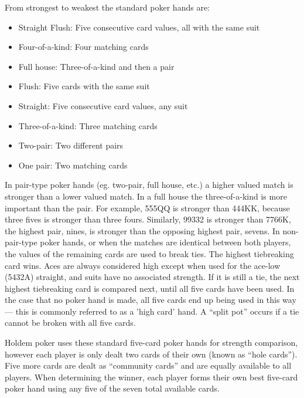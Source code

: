 From strongest to weakest the standard poker hands are:

\begin{itemize}
\singlespacing
\item Straight Flush: Five consecutive card values, all with the same suit
\item Four-of-a-kind: Four matching cards
\item Full house: Three-of-a-kind and then a pair
\item Flush: Five cards with the same suit
\item Straight: Five consecutive card values, any suit
\item Three-of-a-kind: Three matching cards
\item Two-pair: Two different pairs
\item One pair: Two matching cards
\end{itemize}
In pair-type poker hands (eg. two-pair, full house, etc.) a higher valued match is stronger than a lower valued match.
In a full house the three-of-a-kind is more important than the pair.
For example, 555QQ is stronger than 444KK, because three fives is stronger than three fours.
Similarly, 99332 is stronger than 7766K, the highest pair, nines, is stronger than the opposing highest pair, sevens.
In non-pair-type poker hands, or when the matches are identical between both players, the values of the remaining cards are used to break ties.
The highest tiebreaking card wins.
Aces are always considered high except when used for the ace-low (5432A) straight, and suits have no associated strength.
If it is still a tie, the next highest tiebreaking card is compared next, until all five cards have been used.
In the case that no poker hand is made, all five cards end up being used in this way --- this is commonly referred to as a 'high card' hand.
A ``split pot'' occurs if a tie cannot be broken with all five cards.

Holdem poker uses these standard five-card poker hands for strength comparison, however each player is only dealt two cards of their own (known as ``hole cards'').
Five more cards are dealt as ``community cards'' and are equally available to all players.
When determining the winner, each player forms their own best five-card poker hand using any five of the seven total available cards.


